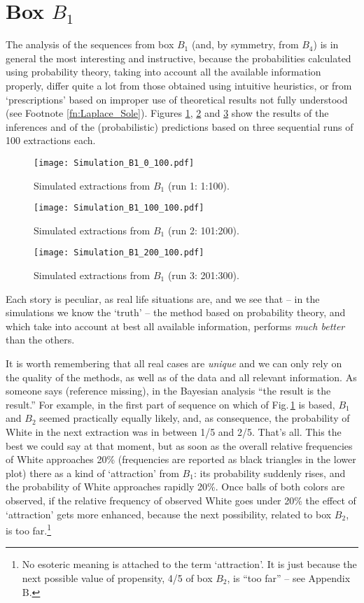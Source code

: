 \documentclass[11pt]{article}
\begin{document}
\section{Box $B_1$}
The analysis of the sequences 
from box $B_1$ (and, by symmetry, from $B_4$) 
is in general the most interesting and instructive, 
because the probabilities calculated using 
probability theory, taking into account all the available information
properly, differ quite a lot from those obtained 
using intuitive heuristics, or  from `prescriptions'
based on improper use of theoretical results not fully understood
(see Footnote \ref{fn:Laplace_Sole}). 
Figures 
\ref{fig:Simulazione_B1_0_100}, 
\ref{fig:Simulazione_B1_100_100}
and \ref{fig:Simulazione_B1_200_100} show the results
of the inferences and of the (probabilistic) predictions
based on three sequential runs of 100 extractions each. 
\begin{figure}
\centerline{\texttt{[image: Simulation\_B1\_0\_100.pdf]}}
\caption{\small \sf Simulated extractions from $B_1$ (run 1: 1:100).}
\label{fig:Simulazione_B1_0_100}
\end{figure}
\begin{figure}
\centerline{\texttt{[image: Simulation\_B1\_100\_100.pdf]}}
\caption{\small \sf Simulated extractions from $B_1$ (run 2: 101:200).}
\label{fig:Simulazione_B1_100_100}
\end{figure}
\begin{figure}
\centerline{\texttt{[image: Simulation\_B1\_200\_100.pdf]}}
\caption{\small \sf Simulated extractions from $B_1$ (run 3: 201:300).}
\label{fig:Simulazione_B1_200_100}
\end{figure}
Each story is peculiar, 
as real life situations are, 
and we see that -- in the simulations 
we know the `truth' -- the method based
on probability theory, and which take into account at best 
all available information,
performs {\em much better} than the others. 

It is worth 
remembering that all real cases
are {\em unique} and we can only rely on the quality
of the methods, as well as of the data and all relevant information.
As someone says (reference missing), in the Bayesian 
analysis ``the result is the result.'' For example, in the
first part of  
sequence on which of Fig.\,\ref{fig:Simulazione_B1_0_100}
is based, $B_1$ and  $B_2$ seemed practically equally likely, 
and, as consequence, the probability of White in the 
next extraction was in between 1/5 and 2/5. That's all. 
This the best we could say at that moment, but as soon as the 
overall relative frequencies of White approaches 20\%
(frequencies are reported as black triangles in the lower plot)
there as a kind of `attraction' from $B_1$: its probability
suddenly rises, and the probability of White approaches rapidly
20\%. Once balls of both colors are observed,
if the relative frequency of observed White 
goes under 20\% the effect of `attraction'
gets more enhanced, because the next possibility, related
to box $B_2$, is too far.\footnote{No esoteric meaning is attached
  to the term `attraction'. It is just because
  the next possible value of propensity, 4/5 of box $B_2$, is ``too far''
  -- see Appendix B.
} 
  
\end{document}
